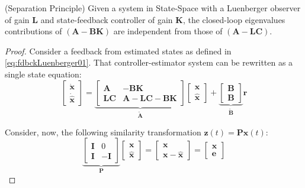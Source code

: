 \documentclass[a4paper,11pt]{book}
\numberwithin{figure}{chapter}
\numberwithin{equation}{chapter}
\numberwithin{table}{chapter}
\newtheorem{theorem}{Theorem}[chapter]
\theoremstyle{definition}
\newcounter{boxed-theorem}
\newenvironment{boxed-theorem}[1]
{\begin{shaded} \begin{theorem}{#1}}
{\end{theorem} \end{shaded}}
\newcounter{boxed-definition}
\begin{document}
\begin{boxed-theorem}{(Separation Principle)} \label{th:separationPrinciple}
	Given a system in State-Space with a Luenberger observer of gain $\bm{L}$ and state-feedback controller of gain $\bm{K}$, the closed-loop eigenvalues contributions of $(\bm{A} - \bm{B}\bm{K})$ are independent from those of $(\bm{A} - \bm{L}\bm{C})$.
\end{boxed-theorem}

\begin{proof}
	Consider a feedback from estimated states as defined in \eqref{eq:fdbckLuenberger01}. That controller-estimator system can be rewritten as a single state equation:
	\begin{equation}
	\begin{bmatrix} \dot{\bm{x}} \\ \dot{\hat{\bm{x}}}	\end{bmatrix}
	=
	\underbrace{\begin{bmatrix}
		\bm{A} & - \bm{B} \bm{K} \\
		\bm{L} \bm{C} & \bm{A} - \bm{L} \bm{C} - \bm{B} \bm{K}
	\end{bmatrix}}_{\tilde{\bm{A}}} \begin{bmatrix} \bm{x} \\ \hat{\bm{x}} \end{bmatrix}
	+
	\underbrace{\begin{bmatrix}	\bm{B} \\ \bm{B} \end{bmatrix}}_{\tilde{\bm{B}}} \bm{r}
\end{equation} 

Consider, now, the following similarity transformation $\bm{z}(t) = \bm{P} \bm{x}(t)$:
\begin{equation}
	\underbrace{\begin{bmatrix}
		\bm{I} & 0 \\ \bm{I} & -\bm{I}
	\end{bmatrix}}_{\bm{P}} \begin{bmatrix}
		\bm{x} \\ \hat{\bm{x}}
	\end{bmatrix} = \begin{bmatrix}
		\bm{x} \\ \bm{x} - \hat{\bm{x}}
	\end{bmatrix} = \begin{bmatrix}
		\bm{x} \\ \bm{e}
	\end{bmatrix} 
\end{equation}


\end{proof}
\end{document}
